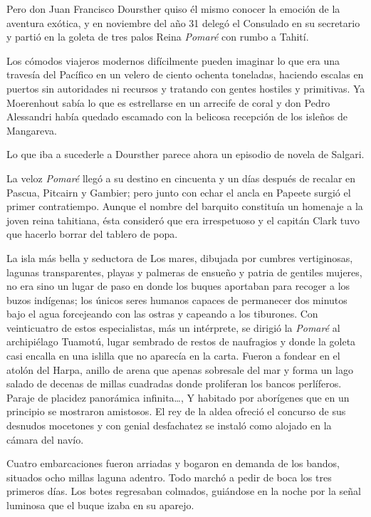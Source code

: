 \documentclass[10pt,twoside,openright]{memoir}
\begin{document}
Pero don Juan Francisco Doursther quiso él mismo conocer la emoción de
la aventura exótica, y en noviembre del año 31 delegó el Consulado en su
secretario y partió en la goleta de tres palos Reina
\emph{Pomaré} con rumbo a Tahití.

Los cómodos viajeros modernos difícilmente pueden imaginar lo que era
una travesía del Pacífico en un
velero de ciento ochenta toneladas, haciendo escalas en puertos sin
autoridades ni recursos y tratando con gentes hostiles y primitivas. Ya
Moerenhout sabía lo que es
estrellarse en un arrecife de coral y don Pedro Alessandri había quedado
escamado con la belicosa recepción de los isleños de Mangareva.

Lo que iba a sucederle a Doursther parece ahora un episodio de novela de
Salgari.

 La veloz \emph{Pomaré} llegó a su destino
en cincuenta y un días después de recalar en Pascua, Pitcairn y Gambier;
pero junto con echar el ancla en Papeete surgió el primer contratiempo.
Aunque el nombre del barquito constituía un homenaje a la joven reina
tahitiana, ésta consideró que era irrespetuoso y el capitán Clark tuvo
que hacerlo borrar del tablero de popa.

La isla más bella y seductora de Los mares, dibujada por cumbres
vertiginosas, lagunas transparentes,
playas y palmeras de ensueño y patria
de gentiles mujeres, no era sino un lugar de paso en donde los buques
aportaban para recoger a los buzos indígenas; los únicos seres humanos
capaces de permanecer dos minutos bajo el agua forcejeando con las
ostras y capeando a los tiburones. Con veinticuatro de estos
especialistas, más un intérprete, se dirigió la \emph{Pomaré} al archipiélago
Tuamotú, lugar sembrado de restos de naufragios y donde la goleta casi
encalla en una islilla que no aparecía en la carta. Fueron a fondear en
el atolón del Harpa, anillo de arena que apenas sobresale del mar y
forma un lago salado de decenas de millas cuadradas donde proliferan los
bancos perlíferos. Paraje de placidez panorámica infinita\ldots, Y habitado
por aborígenes que en un principio se
mostraron amistosos. El rey de la aldea ofreció el concurso de sus
desnudos mocetones y con genial desfachatez se
instaló como alojado en la cámara del
navío.

Cuatro embarcaciones fueron arriadas y bogaron en demanda de los bandos,
situados ocho millas laguna adentro. Todo marchó a pedir de boca los
tres primeros días. Los botes
regresaban colmados, guiándose en la noche por la señal luminosa que el
buque izaba en su aparejo.
\end{document}

